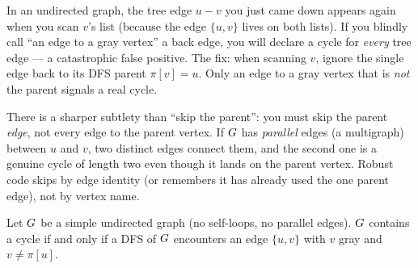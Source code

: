 \begin{trapbox}
In an undirected graph, the tree edge $u-v$ you just came down appears again when you scan $v$'s list (because the edge $\{u,v\}$ lives on both lists). If you blindly call ``an edge to a gray vertex'' a back edge, you will declare a cycle for \emph{every} tree edge --- a catastrophic false positive. The fix: when scanning $v$, ignore the single edge back to its DFS parent $\pi[v]=u$. Only an edge to a gray vertex that is \emph{not} the parent signals a real cycle.
\end{trapbox}

There is a sharper subtlety than ``skip the parent'': you must skip the parent \emph{edge}, not every edge to the parent vertex. If $G$ has \emph{parallel} edges (a multigraph) between $u$ and $v$, two distinct edges connect them, and the second one is a genuine cycle of length two even though it lands on the parent vertex. Robust code skips by edge identity (or remembers it has already used the one parent edge), not by vertex name.

\begin{theorem}\label{ch03:thm-undircycle}
Let $G$ be a simple undirected graph (no self-loops, no parallel edges). $G$ contains a cycle if and only if a DFS of $G$ encounters an edge $\{u,v\}$ with $v$ gray and $v\ne\pi[u]$.
\end{theorem}

